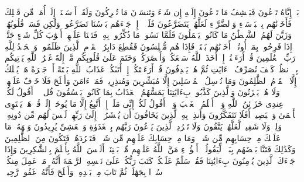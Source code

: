 \stopbuffer%
\startbuffer[\q:6:41]
بَلۡ إِیَّاهُ تَدۡعُونَ فَیَكۡشِفُ مَا تَدۡعُونَ إِلَیۡهِ إِن شَاۤءَ وَتَنسَوۡنَ مَا تُشۡرِكُونَ%
\stopbuffer%
\startbuffer[\q:6:42]
وَلَقَدۡ أَرۡسَلۡنَاۤ إِلَىٰۤ أُمَمࣲ مِّن قَبۡلِكَ فَأَخَذۡنَٰهُم بِٱلۡبَأۡسَاۤءِ وَٱلضَّرَّاۤءِ لَعَلَّهُمۡ یَتَضَرَّعُونَ%
\stopbuffer%
\startbuffer[\q:6:43]
فَلَوۡلَاۤ إِذۡ جَاۤءَهُم بَأۡسُنَا تَضَرَّعُوا۟ وَلَٰكِن قَسَتۡ قُلُوبُهُمۡ وَزَیَّنَ لَهُمُ ٱلشَّیۡطَٰنُ مَا كَانُوا۟ یَعۡمَلُونَ%
\stopbuffer%
\startbuffer[\q:6:44]
فَلَمَّا نَسُوا۟ مَا ذُكِّرُوا۟ بِهِۦ فَتَحۡنَا عَلَیۡهِمۡ أَبۡوَٰبَ كُلِّ شَیۡءٍ حَتَّىٰۤ إِذَا فَرِحُوا۟ بِمَاۤ أُوتُوۤا۟ أَخَذۡنَٰهُم بَغۡتَةࣰ فَإِذَا هُم مُّبۡلِسُونَ%
\stopbuffer%
\startbuffer[\q:6:45]
فَقُطِعَ دَابِرُ ٱلۡقَوۡمِ ٱلَّذِینَ ظَلَمُوا۟ۚ وَٱلۡحَمۡدُ لِلَّهِ رَبِّ ٱلۡعَٰلَمِینَ%
\stopbuffer%
\startbuffer[\q:6:46]
قُلۡ أَرَءَیۡتُمۡ إِنۡ أَخَذَ ٱللَّهُ سَمۡعَكُمۡ وَأَبۡصَٰرَكُمۡ وَخَتَمَ عَلَىٰ قُلُوبِكُم مَّنۡ إِلَٰهٌ غَیۡرُ ٱللَّهِ یَأۡتِیكُم بِهِۗ ٱنظُرۡ كَیۡفَ نُصَرِّفُ ٱلۡءَایَٰتِ ثُمَّ هُمۡ یَصۡدِفُونَ%
\stopbuffer%
\startbuffer[\q:6:47]
قُلۡ أَرَءَیۡتَكُمۡ إِنۡ أَتَىٰكُمۡ عَذَابُ ٱللَّهِ بَغۡتَةً أَوۡ جَهۡرَةً هَلۡ یُهۡلَكُ إِلَّا ٱلۡقَوۡمُ ٱلظَّٰلِمُونَ%
\stopbuffer%
\startbuffer[\q:6:48]
وَمَا نُرۡسِلُ ٱلۡمُرۡسَلِینَ إِلَّا مُبَشِّرِینَ وَمُنذِرِینَۖ فَمَنۡ ءَامَنَ وَأَصۡلَحَ فَلَا خَوۡفٌ عَلَیۡهِمۡ وَلَا هُمۡ یَحۡزَنُونَ%
\stopbuffer%
\startbuffer[\q:6:49]
وَٱلَّذِینَ كَذَّبُوا۟ بِءَایَٰتِنَا یَمَسُّهُمُ ٱلۡعَذَابُ بِمَا كَانُوا۟ یَفۡسُقُونَ%
\stopbuffer%
\startbuffer[\q:6:50]
قُل لَّاۤ أَقُولُ لَكُمۡ عِندِی خَزَاۤئِنُ ٱللَّهِ وَلَاۤ أَعۡلَمُ ٱلۡغَیۡبَ وَلَاۤ أَقُولُ لَكُمۡ إِنِّی مَلَكٌۖ إِنۡ أَتَّبِعُ إِلَّا مَا یُوحَىٰۤ إِلَیَّۚ قُلۡ هَلۡ یَسۡتَوِی ٱلۡأَعۡمَىٰ وَٱلۡبَصِیرُۚ أَفَلَا تَتَفَكَّرُونَ%
\stopbuffer%
\startbuffer[\q:6:51]
وَأَنذِرۡ بِهِ ٱلَّذِینَ یَخَافُونَ أَن یُحۡشَرُوۤا۟ إِلَىٰ رَبِّهِمۡ لَیۡسَ لَهُم مِّن دُونِهِۦ وَلِیࣱّ وَلَا شَفِیعࣱ لَّعَلَّهُمۡ یَتَّقُونَ%
\stopbuffer%
\startbuffer[\q:6:52]
وَلَا تَطۡرُدِ ٱلَّذِینَ یَدۡعُونَ رَبَّهُم بِٱلۡغَدَوٰةِ وَٱلۡعَشِیِّ یُرِیدُونَ وَجۡهَهُۥۖ مَا عَلَیۡكَ مِنۡ حِسَابِهِم مِّن شَیۡءࣲ وَمَا مِنۡ حِسَابِكَ عَلَیۡهِم مِّن شَیۡءࣲ فَتَطۡرُدَهُمۡ فَتَكُونَ مِنَ ٱلظَّٰلِمِینَ%
\stopbuffer%
\startbuffer[\q:6:53]
وَكَذَٰلِكَ فَتَنَّا بَعۡضَهُم بِبَعۡضࣲ لِّیَقُولُوۤا۟ أَهَٰۤؤُلَاۤءِ مَنَّ ٱللَّهُ عَلَیۡهِم مِّنۢ بَیۡنِنَاۤۗ أَلَیۡسَ ٱللَّهُ بِأَعۡلَمَ بِٱلشَّٰكِرِینَ%
\stopbuffer%
\startbuffer[\q:6:54]
وَإِذَا جَاۤءَكَ ٱلَّذِینَ یُؤۡمِنُونَ بِءَایَٰتِنَا فَقُلۡ سَلَٰمٌ عَلَیۡكُمۡۖ كَتَبَ رَبُّكُمۡ عَلَىٰ نَفۡسِهِ ٱلرَّحۡمَةَ أَنَّهُۥ مَنۡ عَمِلَ مِنكُمۡ سُوۤءَۢا بِجَهَٰلَةࣲ ثُمَّ تَابَ مِنۢ بَعۡدِهِۦ وَأَصۡلَحَ فَأَنَّهُۥ غَفُورࣱ رَّحِیمࣱ%
